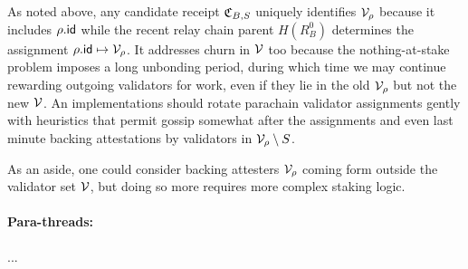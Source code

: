 As noted above, any candidate receipt $\mathfrak{C}_{B,S}$ uniquely identifies $\mathcal{V}_{\rho}$ because it includes $\rho.\mathsf{id}$ while the recent relay chain parent $H(R^0_B)$ determines the assignment $\rho.\mathsf{id} \mapsto \mathcal{V}_{\rho}$.
It addresses churn in $\mathcal{V}$ too because the nothing-at-stake problem imposes a long unbonding period, during which time we may continue rewarding outgoing validators for work, even if they lie in the old $\mathcal{V}_{\rho}$ but not the new $\mathcal{V}$.   
An implementations should rotate parachain validator assignments gently with heuristics that permit gossip somewhat after the assignments and even last minute backing attestations by validators in $\mathcal{V}_{\rho} \setminus S$.

As an aside, one could consider backing attesters $\mathcal{V}_{\rho}$ coming form outside the validator set $\mathcal{V}$, but doing so more requires more complex staking logic. 

\smallskip
\paragraph{Para-threads:}

...
